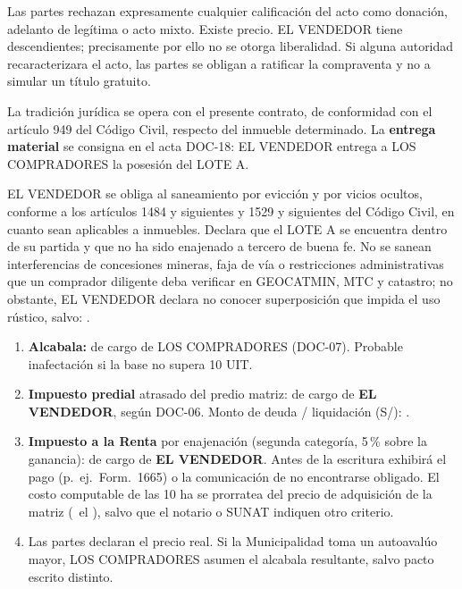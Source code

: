 \documentclass[12pt,a4paper]{article}
\begin{document}
Las partes rechazan expresamente cualquier calificación del acto como donación, adelanto de legítima o acto mixto. Existe precio. EL VENDEDOR tiene descendientes; precisamente por ello no se otorga liberalidad. Si alguna autoridad recaracterizara el acto, las partes se obligan a ratificar la compraventa y no a simular un título gratuito.

La tradición jurídica se opera con el presente contrato, de conformidad con el artículo 949 del Código Civil, respecto del inmueble determinado. La \textbf{entrega material} se consigna en el acta DOC-18: EL VENDEDOR entrega a LOS COMPRADORES la posesión del LOTE A.

EL VENDEDOR se obliga al saneamiento por evicción y por vicios ocultos, conforme a los artículos 1484 y siguientes y 1529 y siguientes del Código Civil, en cuanto sean aplicables a inmuebles. Declara que el LOTE A se encuentra dentro de su partida y que no ha sido enajenado a tercero de buena fe. No se sanean interferencias de concesiones mineras, faja de vía o restricciones administrativas que un comprador diligente deba verificar en GEOCATMIN, MTC y catastro; no obstante, EL VENDEDOR declara no conocer superposición que impida el uso rústico, salvo: .

\begin{enumerate}[leftmargin=1.15cm]
\item \textbf{Alcabala:} de cargo de LOS COMPRADORES (DOC-07). Probable inafectación si la base no supera 10 UIT.
\item \textbf{Impuesto predial} atrasado del predio matriz: de cargo de \textbf{EL VENDEDOR}, según DOC-06. Monto de deuda / liquidación (S/): \DeudaPredialReferencia.
\item \textbf{Impuesto a la Renta} por enajenación (segunda categoría, 5\,\% sobre la ganancia): de cargo de \textbf{EL VENDEDOR}. Antes de la escritura exhibirá el pago (p.~ej.\ Form.\ 1665) o la comunicación de no encontrarse obligado. El costo computable de las 10 ha se prorratea del precio de adquisición de la matriz (\PrecioAdquisicionMatriz\ el \FechaAdquisicionMatriz), salvo que el notario o SUNAT indiquen otro criterio.
\item Las partes declaran el precio real. Si la Municipalidad toma un autoavalúo mayor, LOS COMPRADORES asumen el alcabala resultante, salvo pacto escrito distinto.
\end{enumerate}
\end{document}
